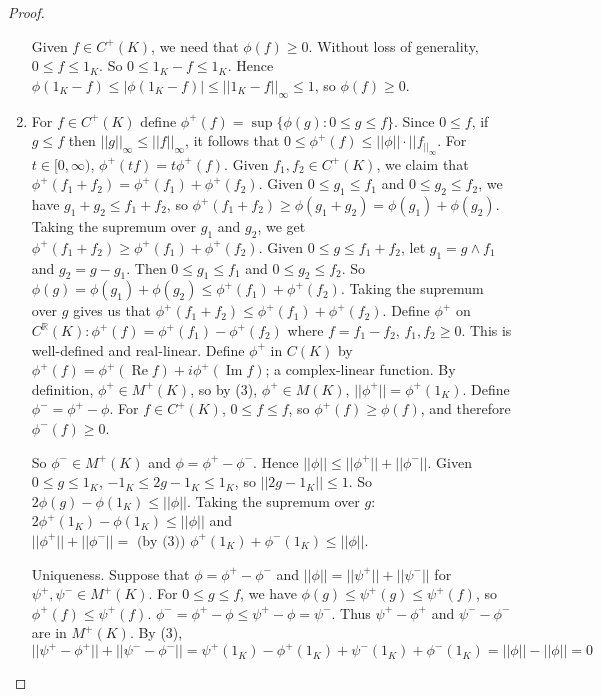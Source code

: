 \begin{proof}
\begin{enumerate}
    Given $f\in C^+(K)$, we need that $\phi(f)\geq 0$. Without loss of generality,
    $0\leq f\leq 1_K$.
    So $0\leq 1_K-f\leq 1_K$.
    Hence $\phi(1_K-f)\leq |\phi(1_K-f)|\leq ||1_K-f||_\infty\leq 1$,
    so $\phi(f)\geq 0$.

    \item For $f\in C^+(K)$ define $\phi^+(f)=\sup\{\phi(g):0\leq g\leq f\}$.
    Since $0\leq f$, if $g\leq f$ then $||g||_\infty\leq ||f||_\infty$,
    it follows that $0\leq \phi^+(f)\leq ||\phi||\cdot ||f_||_\infty$.
    For $t\in [0,\infty)$, $\phi^+(tf)=t\phi^+(f)$.
    Given $f_1,f_2\in C^+(K)$, we claim that $\phi^+(f_1+f_2)=\phi^+(f_1) +\phi^+(f_2)$.
    Given $0\leq g_1\leq f_1$ and $0\leq g_2\leq f_2$,
    we have $g_1+g_2\leq f_1+f_2$,
    so $\phi^+(f_1+f_2)\geq \phi (g_1+g_2)=\phi(g_1)+\phi(g_2)$.
    Taking the supremum over $g_1$ and $g_2$,
    we get
    $\phi^+(f_1+f_2)\geq \phi^+(f_1)+\phi^+(f_2)$.
    Given $0\leq g\leq f_1+f_2$,
    let $g_1=g\wedge f_1$ and $g_2=g-g_1$.
    Then $0\leq g_1\leq f_1$ and $0\leq g_2\leq f_2$.
    So $\phi(g)=\phi(g_1)+\phi(g_2)\leq \phi^+(f_1)+\phi^+(f_2)$.
    Taking the supremum over $g$ gives us that
    $\phi^+(f_1+f_2)\leq \phi^+(f_1)+\phi^+(f_2)$.
    Define $\phi^+$ on $C^\mathbb{R}(K):\phi^+(f)=\phi^+(f_1)-\phi^+(f_2)$
    where $f=f_1-f_2$, $f_1,f_2\geq 0$.
    This is well-defined and real-linear.
    Define $\phi^+$ in $C(K)$
    by $\phi^+(f)=\phi^+(\operatorname{Re} f)+i\phi^+(\operatorname{Im} f)$;
    a complex-linear function.
    By definition, $\phi^+\in M^+(K)$,
    so by (3), $\phi^+\in M(K)$, $||\phi^+||=\phi^+(1_K)$.
    Define $\phi^-=\phi^+-\phi$.
    For $f\in C^+(K)$,
    $0\leq f\leq f$,
    so $\phi^+(f)\geq \phi(f)$, and therefore $\phi^-(f)\geq 0$.

    So $\phi^-\in M^+(K)$ and $\phi=\phi^+-\phi^-$.
    Hence $||\phi||\leq ||\phi^+||+||\phi^-||$.
    Given $0\leq g\leq 1_K$,
    $-1_K\leq 2g-1_K\leq 1_K$,
    so $||2g-1_K||\leq 1$.
    So $2\phi(g)-\phi(1_K)\leq ||\phi||$.
    Taking the supremum over $g$:
    $2\phi^+(1_K)-\phi(1_K)\leq ||\phi||$
and
    $||\phi^+||+||\phi^-|| =\text{ (by (3)) }\phi^+(1_K)+\phi^-(1_K)\leq ||\phi||$.

    Uniqueness. Suppose that $\phi=\phi^+-\phi^-$
    and $||\phi||=||\psi^+||+||\psi^-||$
    for $\psi^+,\psi^-\in M^+(K)$.
    For $0\leq g\leq f$, we have $\phi(g)\leq\psi^+(g)\leq \psi^+(f)$,
    so $\phi^+(f)\leq \psi^+(f)$.
     $\phi^-=\phi^+-\phi\leq \psi^+-\phi=\psi^-$.
     Thus $\psi^+-\phi^+$ and $\psi^--\phi^-$ are in $M^+(K)$.
     By (3), $||\psi^+-\phi^+||+||\psi^--\phi^-||=\psi^+(1_K)-\phi^+(1_K)+\psi^-(1_K)+\phi^-(1_K)=||\phi||-||\phi||=0$
  \end{enumerate}
\end{proof}




























%
